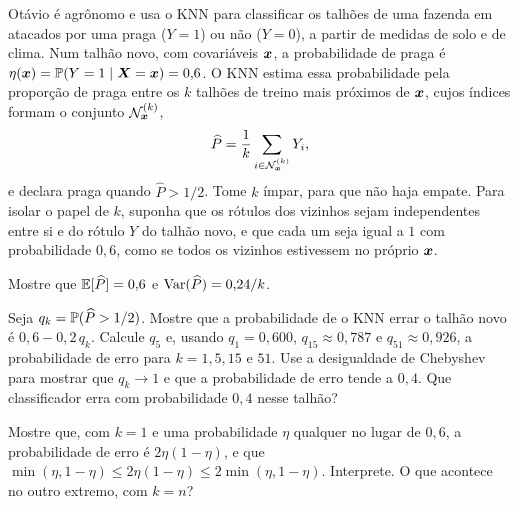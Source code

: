 Otávio é agrônomo e usa o KNN para classificar os talhões de uma fazenda em atacados por uma
praga ($Y=1$) ou não ($Y=0$), a partir de medidas de solo e de clima. Num talhão novo, com
covariáveis $\bm{x}$, a probabilidade de praga é $\eta(\bm{x})=\mathbb{P}(Y=1\mid\bm{X}=\bm{x})=0{,}6$. O KNN
estima essa probabilidade pela proporção de praga entre os $k$ talhões de treino mais
próximos de $\bm{x}$, cujos índices formam o conjunto $\mathcal{N}_{\bm{x}}^{(k)}$,
\[
  \widehat P=\frac1k\sum_{i\in\mathcal{N}_{\bm{x}}^{(k)}}Y_i ,
\]
e declara praga quando $\widehat P>1/2$. Tome $k$ ímpar, para que não haja empate. Para
isolar o papel de $k$, suponha que os rótulos dos vizinhos sejam independentes entre si e
do rótulo $Y$ do talhão novo, e que cada um seja igual a $1$ com probabilidade $0{,}6$, como
se todos os vizinhos estivessem no próprio $\bm{x}$.
\begin{itens}
  \item {} Mostre que $\mathbb{E}[\widehat P]=0{,}6$ e $\operatorname{Var}(\widehat P)=0{,}24/k$.
  \item {} Seja $q_k=\mathbb{P}(\widehat P>1/2)$. Mostre que a probabilidade de o KNN errar
        o talhão novo é $0{,}6-0{,}2\,q_k$. Calcule $q_5$ e, usando $q_1=0{,}600$,
        $q_{15}\approx0{,}787$ e $q_{51}\approx0{,}926$, a probabilidade de erro para
        $k=1,5,15$ e $51$. Use a desigualdade de Chebyshev para mostrar que $q_k\to1$ e que a
        probabilidade de erro tende a $0{,}4$. Que classificador erra com probabilidade
        $0{,}4$ nesse talhão?
  \item {} Mostre que, com $k=1$ e uma probabilidade $\eta$ qualquer no lugar de
        $0{,}6$, a probabilidade de erro é $2\eta(1-\eta)$, e que
        $\min(\eta,1-\eta)\le2\eta(1-\eta)\le2\min(\eta,1-\eta)$. Interprete. O que acontece
        no outro extremo, com $k=n$?
\end{itens}

